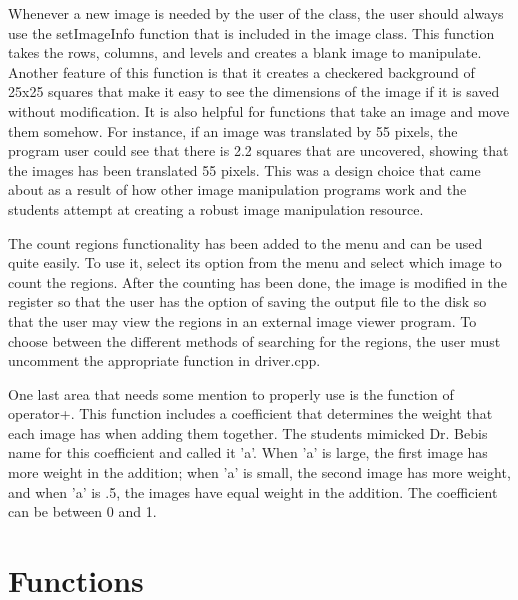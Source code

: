 \documentclass[pdftex, 11pt]{article}
\begin{document}
Whenever a new image is needed by the user of the class, the user should always use the setImageInfo function that is
included in the image class. This function takes the rows, columns, and levels and creates a blank image to manipulate.
Another feature of this function is that it creates a checkered background of 25x25 squares that make it easy to see the
dimensions of the image if it is saved without modification. It is also helpful for functions that take an image and
move them somehow. For instance, if an image was translated by 55 pixels, the program user could see that there is 2.2
squares that are uncovered, showing that the images has been translated 55 pixels. This was a design choice that came
about as a result of how other image manipulation programs work and the students attempt at creating a robust image
manipulation resource.

The count regions functionality has been added to the menu and can be used quite easily. To use it, select its option
from the menu and select which image to count the regions. After the counting has been done, the image is modified in
the register so that the user has the option of saving the output file to the disk so that the user may view the regions
in an external image viewer program. To choose between the different methods of searching for the regions, the user must
uncomment the appropriate function in driver.cpp. 

One last area that needs some mention to properly use is the function of operator+. This function includes a coefficient
that determines the weight that each image has when adding them together. The students mimicked Dr. Bebis name for this
coefficient and called it 'a'. When 'a' is large, the first image has more weight in the addition; when 'a' is small,
the second image has more weight, and when 'a' is .5, the images have equal weight in the addition. The coefficient can
be between 0 and 1.

\section{Functions}
\end{document}
